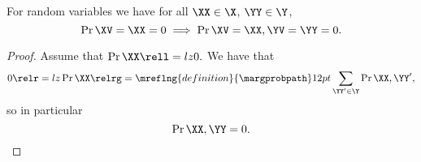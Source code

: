 \begin{proposition}

  For random variables 
  we have for all $\XX \in \X$, $\YY \in \Y$,
  $$\Pr{\XV = \XX}  = 0 \implies \Pr{\XV = \XX, \YV = \YY} = 0.$$%
\end{proposition}

\begin{proof}
  Assume that $\Pr{\XX} \rell = lz 0.$
  We have that
  $$0 \relr = lz \Pr{\XX} \relrg = \mreflng{definition}{\margprobpath} 12pt \sum_{\YY' \in \Y}\Pr{\XX, \YY'},$$
  so in particular
  $$\Pr{\XX, \YY} = 0.$$%
\end{proof}

